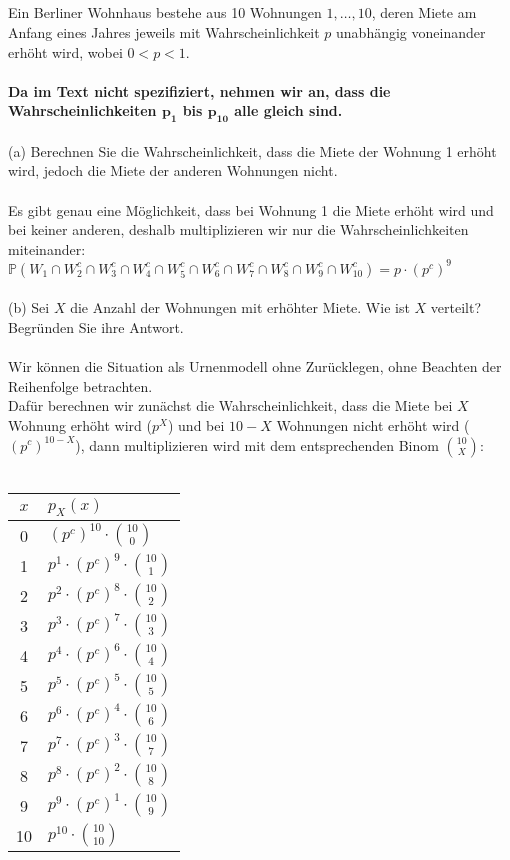 \documentclass[a4paper]{article}
\begin{document}
\subsection{}
Ein Berliner Wohnhaus bestehe aus 10 Wohnungen $1,\dots ,10$, deren Miete am Anfang eines Jahres jeweils mit Wahrscheinlichkeit $p$ unabhängig voneinander erhöht wird, wobei $0 < p < 1$.\\\\
\textbf{Da im Text nicht spezifiziert, nehmen wir an, dass die Wahrscheinlichkeiten $\mathbf{p_1}$ bis $\mathbf{p_{10}}$ alle gleich sind.}\\\\
(a) Berechnen Sie die Wahrscheinlichkeit, dass die Miete der Wohnung 1 erhöht wird, jedoch die Miete der anderen Wohnungen nicht.\\\\
Es gibt genau eine Möglichkeit, dass bei Wohnung 1 die Miete erhöht wird und bei keiner anderen, deshalb multiplizieren wir nur die Wahrscheinlichkeiten miteinander:\\
\(\mathbb{P}(W_1 \cap W_2^c \cap W_3^c \cap W_4^c \cap W_5^c \cap W_6^c \cap W_7^c \cap W_8^c \cap W_9^c \cap W_{10}^c) = p \cdot (p^c)^9\)\\\\
(b) Sei $X$ die Anzahl der Wohnungen mit erhöhter Miete. Wie ist $X$ verteilt? Begründen Sie ihre Antwort.\\\\
Wir können die Situation als Urnenmodell ohne Zurücklegen, ohne Beachten der Reihenfolge betrachten.\\
Dafür berechnen wir zunächst die Wahrscheinlichkeit, dass die Miete bei $X$ Wohnung erhöht wird ($p^X$) und bei $10-X$ Wohnungen nicht erhöht wird ($(p^c)^{10-X}$), dann multiplizieren wird mit dem entsprechenden Binom $\binom{10}{X}$:\\\\
\begin{tabular}{c|l}
    $x$ & $p_X(x)$ \\
    \hline
    0 & $(p^c)^{10} \cdot \binom{10}{0}$\\
    1 & $p^1 \cdot (p^c)^9 \cdot \binom{10}{1}$\\
    2 & $p^2 \cdot (p^c)^8 \cdot \binom{10}{2}$\\
    3 & $p^3 \cdot (p^c)^7 \cdot \binom{10}{3}$\\
    4 & $p^4 \cdot (p^c)^6 \cdot \binom{10}{4}$\\
    5 & $p^5 \cdot (p^c)^5 \cdot \binom{10}{5}$\\
    6 & $p^6 \cdot (p^c)^4 \cdot \binom{10}{6}$\\
    7 & $p^7 \cdot (p^c)^3 \cdot \binom{10}{7}$\\
    8 & $p^8 \cdot (p^c)^2 \cdot \binom{10}{8}$\\
    9 & $p^9 \cdot (p^c)^1 \cdot \binom{10}{9}$\\
    10 & $p^{10} \cdot \binom{10}{10}$
\end{tabular}\\\\
\end{document}

